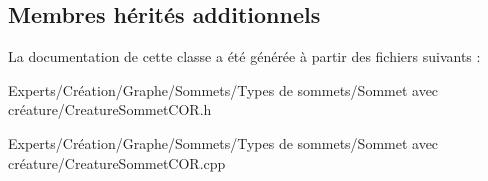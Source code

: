 \subsection*{Membres hérités additionnels}


La documentation de cette classe a été générée à partir des fichiers suivants \+:\begin{DoxyCompactItemize}
\item 
Experts/\+Création/\+Graphe/\+Sommets/\+Types de sommets/\+Sommet avec créature/Creature\+Sommet\+C\+O\+R.\+h\item 
Experts/\+Création/\+Graphe/\+Sommets/\+Types de sommets/\+Sommet avec créature/Creature\+Sommet\+C\+O\+R.\+cpp\end{DoxyCompactItemize}
